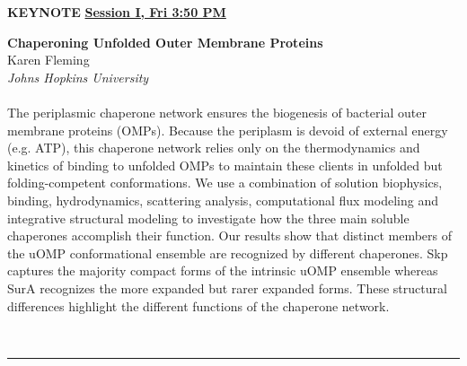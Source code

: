 \documentclass[titlepage,oneside,openany,10pt]{book}
\newenvironment{oralabskeynote}[3]
        {
        \vspace{0.3cm}
        \noindent\textbf{#1}\\%
        #2\\%
        \textit{#3}\\\\%
        }
        {
        \\
        \noindent\rule{15cm}{0.5pt}%
        }
\begin{document}
\begin{shaded}
\noindent\textbf{KEYNOTE} \hfill \textbf{\underline{Session I, Fri 3:50 PM}}

\begin{oralabskeynote}
	{Chaperoning Unfolded Outer Membrane Proteins}
	{Karen Fleming}
	{Johns Hopkins University}
	The periplasmic chaperone network ensures the biogenesis of bacterial outer membrane proteins 
	(OMPs). Because the periplasm is devoid of external energy (e.g. ATP), this chaperone network 
	relies only on the thermodynamics and kinetics of binding to unfolded OMPs to maintain these 
	clients in unfolded but folding-competent conformations. We use a combination of solution 
	biophysics, binding, hydrodynamics, scattering analysis, computational flux modeling and 
	integrative structural modeling to investigate how the three main soluble chaperones accomplish 
	their function. Our results show that distinct members of the uOMP conformational ensemble are
	recognized by different chaperones. Skp captures the majority compact forms of the intrinsic 
	uOMP ensemble whereas SurA recognizes the more expanded but rarer expanded forms. These 
	structural differences highlight the different functions of the chaperone network.
	\label{FlemingK}
\end{oralabskeynote}
\end{shaded}

\vspace{1cm}
\end{document}
